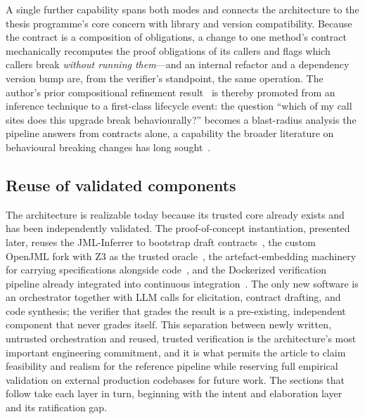 A single further capability spans both modes and connects the architecture to the thesis programme's core concern with library and version compatibility. Because the contract is a composition of obligations, a change to one method's contract mechanically recomputes the proof obligations of its callers and flags which callers break \emph{without running them}---and an internal refactor and a dependency version bump are, from the verifier's standpoint, the same operation. The author's prior compositional refinement result~\cite{edmonds_article3} is thereby promoted from an inference technique to a first-class lifecycle event: the question ``which of my call sites does this upgrade break behaviourally?'' becomes a blast-radius analysis the pipeline answers from contracts alone, a capability the broader literature on behavioural breaking changes has long sought~\cite{mostafa2017behavioral,jayasuriya2024understanding}.

\subsection{Reuse of validated components}
\label{subsec:reuse}

The architecture is realizable today because its trusted core already exists and has been independently validated. The proof-of-concept instantiation, presented later, reuses the JML-Inferrer to bootstrap draft contracts~\cite{edmonds_article1,edmonds_article3}, the custom OpenJML fork with Z3 as the trusted oracle~\cite{cok2014openjml,demoura2008z3}, the artefact-embedding machinery for carrying specifications alongside code~\cite{edmonds_article2}, and the Dockerized verification pipeline already integrated into continuous integration~\cite{edmonds_article4}. The only new software is an orchestrator together with LLM calls for elicitation, contract drafting, and code synthesis; the verifier that grades the result is a pre-existing, independent component that never grades itself. This separation between newly written, untrusted orchestration and reused, trusted verification is the architecture's most important engineering commitment, and it is what permits the article to claim feasibility and realism for the reference pipeline while reserving full empirical validation on external production codebases for future work. The sections that follow take each layer in turn, beginning with the intent and elaboration layer and its ratification gap.
